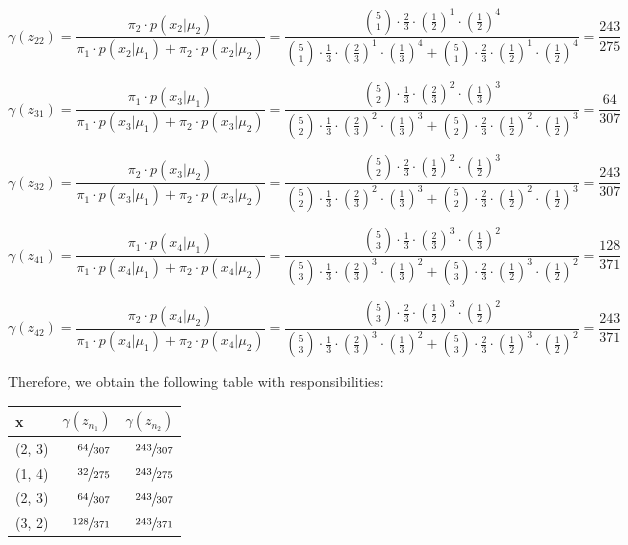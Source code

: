 \documentclass[11pt,a4paper]{article}
\begin{document}
	$$ \gamma(z_{22}) = \frac{\pi_2 \cdot p(x_2|\mu_2)}{\pi_1 \cdot p(x_2|\mu_1)+\pi_2 \cdot p(x_2|\mu_2)} = \frac{\binom {5}{1} \cdot \frac{2}{3} \cdot (\frac{1}{2})^1 \cdot (\frac{1}{2})^4}{\binom {5}{1} \cdot \frac{1}{3} \cdot (\frac{2}{3})^1 \cdot (\frac{1}{3})^4+\binom {5}{1} \cdot \frac{2}{3} \cdot (\frac{1}{2})^1 \cdot (\frac{1}{2})^4}=\frac{243}{275} $$
	
	$$ \gamma(z_{31}) = \frac{\pi_1 \cdot p(x_3|\mu_1)}{\pi_1 \cdot p(x_3|\mu_1)+\pi_2 \cdot p(x_3|\mu_2)} = \frac{\binom {5}{2} \cdot \frac{1}{3} \cdot (\frac{2}{3})^2 \cdot (\frac{1}{3})^3}{\binom {5}{2} \cdot \frac{1}{3} \cdot (\frac{2}{3})^2 \cdot (\frac{1}{3})^3+\binom {5}{2} \cdot \frac{2}{3} \cdot (\frac{1}{2})^2 \cdot (\frac{1}{2})^3}=\frac{64}{307} $$
	
	$$ \gamma(z_{32}) = \frac{\pi_2 \cdot p(x_3|\mu_2)}{\pi_1 \cdot p(x_3|\mu_1)+\pi_2 \cdot p(x_3|\mu_2)} = \frac{\binom {5}{2} \cdot \frac{2}{3} \cdot (\frac{1}{2})^2 \cdot (\frac{1}{2})^3}{\binom {5}{2} \cdot \frac{1}{3} \cdot (\frac{2}{3})^2 \cdot (\frac{1}{3})^3+\binom {5}{2} \cdot \frac{2}{3} \cdot (\frac{1}{2})^2 \cdot (\frac{1}{2})^3}=\frac{243}{307} $$
	
	$$ \gamma(z_{41}) = \frac{\pi_1 \cdot p(x_4|\mu_1)}{\pi_1 \cdot p(x_4|\mu_1)+\pi_2 \cdot p(x_4|\mu_2)} = \frac{\binom {5}{3} \cdot \frac{1}{3} \cdot (\frac{2}{3})^3 \cdot (\frac{1}{3})^2}{\binom {5}{3} \cdot \frac{1}{3} \cdot (\frac{2}{3})^3 \cdot (\frac{1}{3})^2+\binom {5}{3} \cdot \frac{2}{3} \cdot (\frac{1}{2})^3 \cdot (\frac{1}{2})^2}=\frac{128}{371} $$
	
	$$ \gamma(z_{42}) = \frac{\pi_2 \cdot p(x_4|\mu_2)}{\pi_1 \cdot p(x_4|\mu_1)+\pi_2 \cdot p(x_4|\mu_2)} = \frac{\binom {5}{3} \cdot \frac{2}{3} \cdot (\frac{1}{2})^3 \cdot (\frac{1}{2})^2}{\binom {5}{3} \cdot \frac{1}{3} \cdot (\frac{2}{3})^3 \cdot (\frac{1}{3})^2+\binom {5}{3} \cdot \frac{2}{3} \cdot (\frac{1}{2})^3 \cdot (\frac{1}{2})^2}=\frac{243}{371} $$
	
	Therefore, we obtain the following table with responsibilities:
	
	\begin{table}[H]
		\centering
		\begin{tabular}{lrr}
			x       & $\gamma (z_{n_1})$          & $\gamma (z_{n_2})$          \\ \midrule
			(2, 3) & $\sfrac{64}{307}$ & $\sfrac{243}{307}$  \\ 
			\addlinespace
			(1, 4) & $\sfrac{32}{275}$ & $\sfrac{243}{275}$  \\
			\addlinespace
			(2, 3) & $\sfrac{64}{307}$ & $\sfrac{243}{307}$  \\
			\addlinespace
			(3, 2) & $\sfrac{128}{371}$ & $\sfrac{243}{371}$  \\
			\bottomrule
		\end{tabular}
	\end{table}
	
\end{document}
